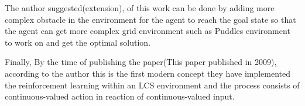 \documentclass[12pt]{article}
\begin{document}
The author suggested(extension), of this work can be done by adding more complex obstacle in the environment for the agent to reach the goal state so that the agent can get more complex grid environment such as Puddles environment \cite{1554945} to work on and get the optimal solution.

Finally, By the time of publishing the paper(This paper published in 2009), according to the author this is the first modern concept they have implemented the reinforcement learning within an LCS environment and the process consists of continuous-valued action in reaction of continuous-valued input.





\end{document}
